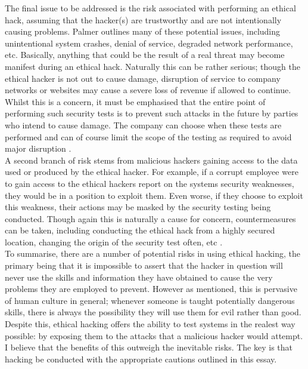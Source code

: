 \documentclass{article}
\begin{document}
The final issue to be addressed is the risk associated with performing an ethical hack, assuming that the hacker(s) are trustworthy and are not intentionally causing problems. Palmer outlines many of these potential issues, including unintentional system crashes, denial of service, degraded network performance, etc. Basically, anything that could be the result of a real threat may become manifest during an ethical hack. Naturally this can be rather serious; though the ethical hacker is not out to cause damage, disruption of service to company networks or websites may cause a severe loss of revenue if allowed to continue. Whilst this is a concern, it must be emphasised that the entire point of performing such security tests is to prevent such attacks in the future by parties who intend to cause damage. The company can choose when these tests are performed and can of course limit the scope of the testing as required to avoid major disruption \cite[pg.~9]{PalmerEthicalHacking}. \\

A second branch of risk stems from malicious hackers gaining access to the data used or produced by the ethical hacker. For example, if a corrupt employee were to gain access to the ethical hackers report on the systems security weaknesses, they would be in a position to exploit them. Even worse, if they choose to exploit this weakness, their actions may be masked by the security testing being conducted. Though again this is naturally a cause for concern, countermeasures can be taken, including conducting the ethical hack from a highly secured location, changing the origin of the security test often, etc \cite[pg.~9]{PalmerEthicalHacking}.\\

To summarise, there are a number of potential risks in using ethical hacking, the primary being that it is impossible to assert that the hacker in question will never use the skills and information they have obtained to cause the very problems they are employed to prevent. However as mentioned, this is pervasive of human culture in general; whenever someone is taught potentially dangerous skills, there is always the possibility they will use them for evil rather than good. Despite this, ethical hacking offers the ability to test systems in the realest way possible: by exposing them to the attacks that a malicious hacker would attempt. I believe that the benefits of this outweigh the inevitable risks. The key is that hacking be conducted with the appropriate cautions outlined in this essay. 



\end{document}
